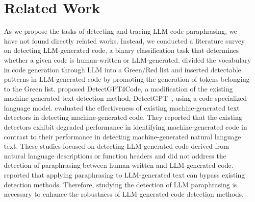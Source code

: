 \section{Related Work}
As we propose the tasks of detecting and tracing LLM code paraphrasing, 
we have not found directly related works. 
Instead, we conducted a literature survey on detecting LLM-generated code, 
a binary classification task that determines whether a given code is human-written or 
LLM-generated.
\citet{lee2024wrote} divided the vocabulary in code generation through LLM 
into a Green/Red list and inserted detectable patterns in LLM-generated code by 
promoting the generation of tokens belonging to the Green list.
\citet{yang2023zero} proposed DetectGPT4Code, a modification of the existing 
machine-generated text detection method, 
DetectGPT~\citep{mitchell2023detectgpt}, using a code-specialized language model. 
\citet{wang2023evaluating} evaluated the effectiveness of existing 
machine-generated text detectors in detecting machine-generated code.
They reported that the existing detectors exhibit degraded performance 
in identifying machine-generated code in contrast to 
their performance in detecting machine-generated natural language text.
These studies focused on detecting LLM-generated code derived from 
natural language descriptions 
or function headers and did not address the detection of paraphrasing between 
human-written and LLM-generated code.
\citet{krishna2023paraphrasing} reported that applying paraphrasing to 
LLM-generated text can bypass existing detection methods. 
Therefore, studying the detection of LLM paraphrasing
is necessary to enhance the robustness of LLM-generated code detection methods.